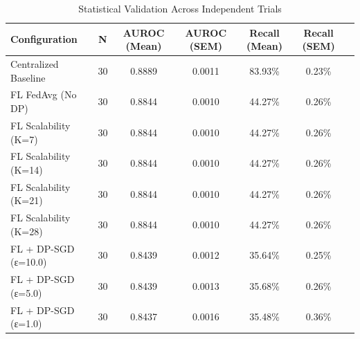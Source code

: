 \begin{table}[h!]
\centering
\caption{Statistical Validation Across Independent Trials}
\label{tab:statistical_validation}
\begin{tabular}{lcccccc}
\toprule
\textbf{Configuration} & \textbf{N} & \textbf{AUROC (Mean)} & \textbf{AUROC (SEM)} & \textbf{Recall (Mean)} & \textbf{Recall (SEM)} \\
\midrule
Centralized Baseline & 30 & 0.8889 & 0.0011 & 83.93\% & 0.23\% \\
FL FedAvg (No DP) & 30 & 0.8844 & 0.0010 & 44.27\% & 0.26\% \\
FL Scalability (K=7) & 30 & 0.8844 & 0.0010 & 44.27\% & 0.26\% \\
FL Scalability (K=14) & 30 & 0.8844 & 0.0010 & 44.27\% & 0.26\% \\
FL Scalability (K=21) & 30 & 0.8844 & 0.0010 & 44.27\% & 0.26\% \\
FL Scalability (K=28) & 30 & 0.8844 & 0.0010 & 44.27\% & 0.26\% \\
FL + DP-SGD (ε=10.0) & 30 & 0.8439 & 0.0012 & 35.64\% & 0.25\% \\
FL + DP-SGD (ε=5.0) & 30 & 0.8439 & 0.0013 & 35.68\% & 0.26\% \\
FL + DP-SGD (ε=1.0) & 30 & 0.8437 & 0.0016 & 35.48\% & 0.36\% \\
\bottomrule
\end{tabular}
\end{table}

